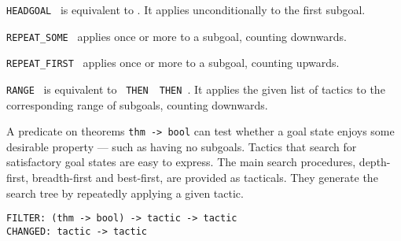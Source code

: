 \begin{isabellebody}
\begin{isamarkuptext}
\begin{description}
  \item \verb|HEADGOAL|~ is equivalent to .
  It applies  unconditionally to the first subgoal.

  \item \verb|REPEAT_SOME|~ applies  once or
  more to a subgoal, counting downwards.

  \item \verb|REPEAT_FIRST|~ applies  once or
  more to a subgoal, counting upwards.

  \item \verb|RANGE|~ is equivalent to
  ~\verb|THEN|~~\verb|THEN|~.  It applies the given list of tactics to the
  corresponding range of subgoals, counting downwards.

  \end{description}%
\end{isamarkuptext}%
\isamarkuptrue%
%
\endisatagmlref
{\isafoldmlref}%
%
\isadelimmlref
%
\endisadelimmlref
%
\isamarkuptrue%
%
\begin{isamarkuptext}%
A predicate on theorems \verb|thm -> bool| can test
  whether a goal state enjoys some desirable property --- such as
  having no subgoals.  Tactics that search for satisfactory goal
  states are easy to express.  The main search procedures,
  depth-first, breadth-first and best-first, are provided as
  tacticals.  They generate the search tree by repeatedly applying a
  given tactic.%
\end{isamarkuptext}%
\isamarkuptrue%
%
\isadelimmlref
%
\endisadelimmlref
%
\isatagmlref
%
\begin{isamarkuptext}%
%
\end{isamarkuptext}%
\isamarkuptrue%
%
\endisatagmlref
{\isafoldmlref}%
%
\isadelimmlref
%
\endisadelimmlref
%
\isamarkuptrue%
%
\begin{isamarkuptext}%
\begin{mldecls}
  \verb|FILTER: (thm -> bool) -> tactic -> tactic| \\
  \verb|CHANGED: tactic -> tactic| \\
  \end{mldecls}


\end{isamarkuptext}
\end{isabellebody}
